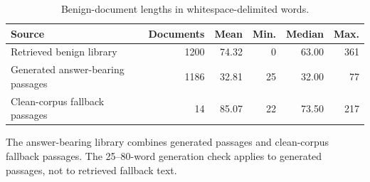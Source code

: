 \begin{table}[!htbp]
\centering
\caption{Benign-document lengths in whitespace-delimited words.}
\label{tab:apx_benign_lengths}
\begingroup\fontsize{9}{10.8}\selectfont
\setlength{\tabcolsep}{4.0pt}
\renewcommand{\arraystretch}{1.13}
\begin{tabular}{@{}lrrrrr@{}}
\toprule
Source & Documents & Mean & Min. & Median & Max. \\
\midrule
Retrieved benign library & 1200 & 74.32 & 0 & 63.00 & 361 \\
Generated answer-bearing passages & 1186 & 32.81 & 25 & 32.00 & 77 \\
Clean-corpus fallback passages & 14 & 85.07 & 22 & 73.50 & 217 \\
\bottomrule
\end{tabular}
\endgroup
\par\vspace{4pt}\begin{minipage}{\linewidth}\footnotesize The answer-bearing library combines generated passages and clean-corpus fallback passages. The 25--80-word generation check applies to generated passages, not to retrieved fallback text.\end{minipage}
\end{table}

